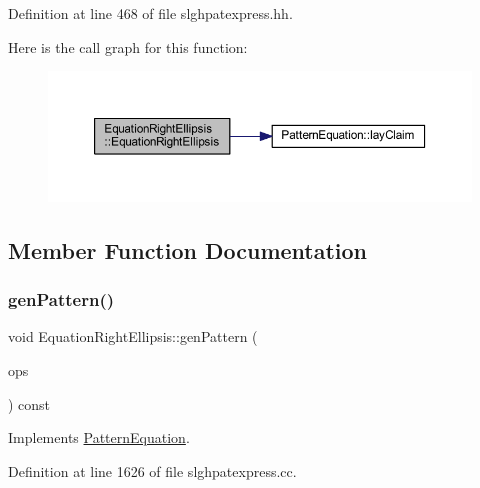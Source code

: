 Definition at line 468 of file slghpatexpress.\+hh.

Here is the call graph for this function\+:
\nopagebreak
\begin{figure}[H]
\begin{center}
\leavevmode
\includegraphics[width=350pt]{class_equation_right_ellipsis_ae3bad99eaef0687a10dd2b825d5b4dd3_cgraph}
\end{center}
\end{figure}


\subsection{Member Function Documentation}
\mbox{\label{class_equation_right_ellipsis_ae250ac9079b2f1d60f5b295095abe36f}} 
\subsubsection{\texorpdfstring{genPattern()}{genPattern()}}
{\footnotesize\ttfamily void Equation\+Right\+Ellipsis\+::gen\+Pattern (\begin{DoxyParamCaption}\item[{const vector$<$ \mbox{\hyperlink{class_token_pattern}{Token\+Pattern}} $>$ \&}]{ops }\end{DoxyParamCaption}) const\hspace{0.3cm}{\ttfamily [virtual]}}



Implements \mbox{\hyperlink{class_pattern_equation_a9838e5bfe5b6013c99567628a6364bfd}{Pattern\+Equation}}.



Definition at line 1626 of file slghpatexpress.\+cc.

